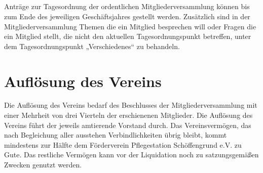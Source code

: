 	\subsection{} Anträge zur Tagesordnung der ordentlichen Mitgliederversammlung können  
	bis zum Ende des jeweiligen Geschäftsjahres gestellt werden. Zusätzlich sind in der Mitgliederversammlung Themen die ein Mitglied besprechen will oder Fragen die ein Mitglied stellt, die nicht den aktuellen Tagesordnungspunkt betreffen, unter dem Tagesordnungspunkt „Verschiedenes“ zu behandeln.

\section{Auflösung des Vereins}	\label{17}
Die Auflösung des Vereins bedarf des Beschlusses der Mitgliederversammlung mit einer Mehrheit von drei Vierteln der erschienenen Mitglieder.
Die Auflösung des Vereins führt der jeweils amtierende Vorstand durch. Das Vereinsvermögen, das nach Begleichung aller ausstehen Verbindlichkeiten übrig bleibt, kommt mindestens zur Hälfte dem Förderverein Pflegestation Schöffengrund e.V. zu Gute. Das restliche Vermögen kann vor der Liquidation noch zu satzungsgemäßen Zwecken genutzt werden. 
















